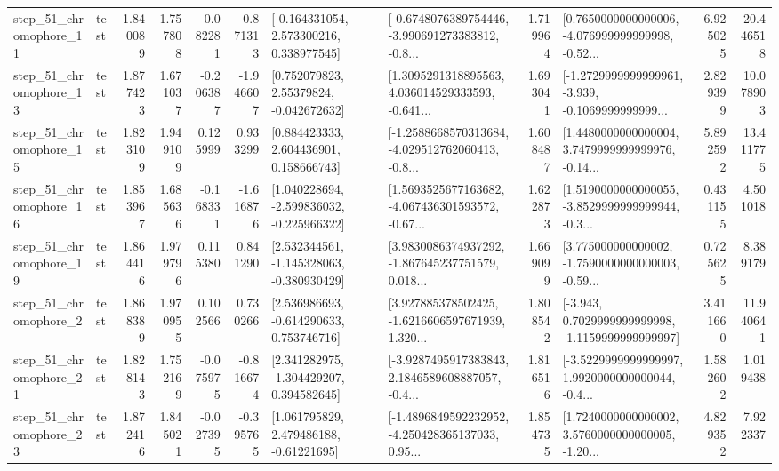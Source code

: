 \begin{tabular}{llrrrrllrlrr}
   step\_51\_chromophore\_11 &      test &      1.840089 &    1.757808 &     -0.082281 & -0.871313 &    [-0.164331054, 2.573300216, 0.338977545] &  [-0.6748076389754446, -3.990691273383812, -0.8... &       1.719964 &  [0.7650000000000006, -4.076999999999998, -0.52... &            6.925025 &         20.446518 \\
   step\_51\_chromophore\_13 &      test &      1.877423 &    1.671037 &     -0.206387 & -1.946607 &     [0.752079823, 2.55379824, -0.042672632] &  [1.3095291318895563, 4.036014529333593, -0.641... &       1.693041 &  [-1.2729999999999961, -3.939, -0.1069999999999... &            2.829399 &         10.078903 \\
   step\_51\_chromophore\_15 &      test &      1.823109 &    1.949109 &      0.125999 &  0.933299 &     [0.884423333, 2.604436901, 0.158666743] &  [-1.2588668570313684, -4.029512762060413, -0.8... &       1.608487 &  [1.4480000000000004, 3.7479999999999976, -0.14... &            5.892592 &         13.411775 \\
   step\_51\_chromophore\_16 &      test &      1.853967 &    1.685636 &     -0.168331 & -1.616876 &   [1.040228694, -2.599836032, -0.225966322] &  [1.5693525677163682, -4.067436301593572, -0.67... &       1.622873 &  [1.5190000000000055, -3.8529999999999944, -0.3... &            0.431155 &          4.501018 \\
   step\_51\_chromophore\_19 &      test &      1.864416 &    1.979796 &      0.115380 &  0.841290 &   [2.532344561, -1.145328063, -0.380930429] &  [3.9830086374937292, -1.867645237751579, 0.018... &       1.669099 &  [3.775000000000002, -1.7590000000000003, -0.59... &            0.725625 &          8.389179 \\
    step\_51\_chromophore\_2 &      test &      1.868389 &    1.970955 &      0.102566 &  0.730266 &    [2.536986693, -0.614290633, 0.753746716] &  [3.927885378502425, -1.6216606597671939, 1.320... &       1.808542 &  [-3.943, 0.7029999999999998, -1.1159999999999997] &            3.411660 &         11.940641 \\
   step\_51\_chromophore\_21 &      test &      1.828143 &    1.752169 &     -0.075975 & -0.816674 &    [2.341282975, -1.304429207, 0.394582645] &  [-3.9287495917383843, 2.1846589608887057, -0.4... &       1.816516 &  [-3.5229999999999997, 1.9920000000000044, -0.4... &            1.582602 &          1.019438 \\
   step\_51\_chromophore\_23 &      test &      1.872416 &    1.845021 &     -0.027395 & -0.395765 &     [1.061795829, 2.479486188, -0.61221695] &  [-1.4896849592232952, -4.250428365137033, 0.95... &       1.854735 &  [1.7240000000000002, 3.5760000000000005, -1.20... &            4.829352 &          7.922337 \\

\end{tabular}
